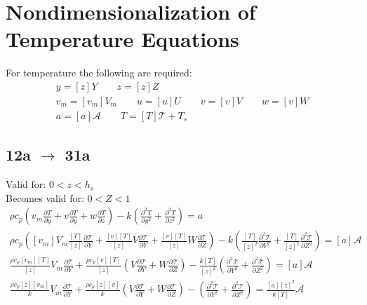 \documentclass[10pt, letterpaper, twoside]{article}
\newcommand{\pd}[2]{\frac{\partial#1}{\partial#2}}
\begin{document}
	\newpage
	
	\section{Nondimensionalization of Temperature Equations}
	For temperature the following are required:
	\begin{gather*}
		y = \left[z\right]Y \qquad z = \left[z\right]Z \\
		v_m = \left[v_m\right]V_m \qquad u = \left[u\right]U \qquad v = \left[v\right]V \qquad w = \left[v\right]W\\
		a = \left[a\right]\mathcal{A} \qquad T = \left[T\right]\mathcal{T}+T_s
	\end{gather*}
	\subsection{12a $ \rightarrow $ 31a}
	Valid for: $ 0<z<h_s $\\
	Becomes valid for: $ 0<Z<1 $
	\begin{gather*}
		\rho c_p\left(v_m\pd{T}{y}+v\pd{T}{y}+w\pd{T}{z}\right) - k\left(\pd{^2T}{y^2}+\pd{^2T}{z^2}\right) = a \tag{12a} \\
		\rho c_p\left(\left[v_m\right]V_m\frac{\left[T\right]}{\left[z\right]}\pd{\mathcal{T}}{Y}+\frac{\left[v\right]\left[T\right]}{\left[z\right]}V\pd{\mathcal{T}}{Y}+\frac{\left[v\right]\left[T\right]}{\left[z\right]}W\pd{\mathcal{T}}{Z}\right) - k\left(\frac{\left[T\right]}{\left[z\right]^2}\pd{^2\mathcal{T}}{Y^2}+\frac{\left[T\right]}{\left[z\right]^2}\pd{^2\mathcal{T}}{Z^2}\right) = \left[a\right]\mathcal{A}\\
		\frac{\rho c_p\left[v_m\right]\left[T\right]}{\left[z\right]}V_m\pd{\mathcal{T}}{Y} + \frac{\rho c_p\left[v\right]\left[T\right]}{\left[z\right]}\left(V\pd{\mathcal{T}}{Y}+W\pd{\mathcal{T}}{Z}\right) - \frac{k\left[T\right]}{\left[z\right]^2}\left(\pd{^2\mathcal{T}}{Y^2}+\pd{^2\mathcal{T}}{Z^2}\right) = \left[a\right]\mathcal{A}\\
		\frac{\rho c_p\left[z\right]\left[v_m\right]}{k}V_m\pd{\mathcal{T}}{Y} + \frac{\rho c_p\left[z\right]\left[v\right]}{k}\left(V\pd{\mathcal{T}}{Y}+W\pd{\mathcal{T}}{Z}\right) - \left(\pd{^2\mathcal{T}}{Y^2}+\pd{^2\mathcal{T}}{Z^2}\right) = \frac{\left[a\right]\left[z\right]^2}{k\left[T\right]}\mathcal{A} \tag{12a'}
	\end{gather*}
\end{document}
